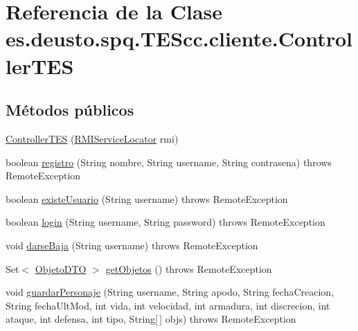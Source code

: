 \hypertarget{classes_1_1deusto_1_1spq_1_1_t_e_scc_1_1cliente_1_1_controller_t_e_s}{\section{Referencia de la Clase es.\+deusto.\+spq.\+T\+E\+Scc.\+cliente.\+Controller\+T\+E\+S}
\label{classes_1_1deusto_1_1spq_1_1_t_e_scc_1_1cliente_1_1_controller_t_e_s}
}
\subsection*{Métodos públicos}
\begin{DoxyCompactItemize}
\item 
\hyperlink{classes_1_1deusto_1_1spq_1_1_t_e_scc_1_1cliente_1_1_controller_t_e_s_a81fda8395f47c407a3f0d577c63f0d3b}{Controller\+T\+E\+S} (\hyperlink{classes_1_1deusto_1_1spq_1_1_t_e_scc_1_1cliente_1_1_r_m_i_service_locator}{R\+M\+I\+Service\+Locator} rmi)
\item 
boolean \hyperlink{classes_1_1deusto_1_1spq_1_1_t_e_scc_1_1cliente_1_1_controller_t_e_s_aff4caec980eda0f4398f4f2cf044fb4f}{registro} (String nombre, String username, String contrasena)  throws Remote\+Exception 
\item 
boolean \hyperlink{classes_1_1deusto_1_1spq_1_1_t_e_scc_1_1cliente_1_1_controller_t_e_s_a452322848dcc1778a46244219881bafc}{existe\+Usuario} (String username)  throws Remote\+Exception 
\item 
boolean \hyperlink{classes_1_1deusto_1_1spq_1_1_t_e_scc_1_1cliente_1_1_controller_t_e_s_a2941198e1c2c65da73798b13b20a4ad8}{login} (String username, String password)  throws Remote\+Exception 
\item 
void \hyperlink{classes_1_1deusto_1_1spq_1_1_t_e_scc_1_1cliente_1_1_controller_t_e_s_acec2816a416111e9fdffba46bc58ab08}{darse\+Baja} (String username)  throws Remote\+Exception 
\item 
Set$<$ \hyperlink{classes_1_1deusto_1_1spq_1_1_t_e_scc_1_1dto_1_1_objeto_d_t_o}{Objeto\+D\+T\+O} $>$ \hyperlink{classes_1_1deusto_1_1spq_1_1_t_e_scc_1_1cliente_1_1_controller_t_e_s_a1ffe0d7b4f3a46cd805f6e1717173fa5}{get\+Objetos} ()  throws Remote\+Exception 
\item 
void \hyperlink{classes_1_1deusto_1_1spq_1_1_t_e_scc_1_1cliente_1_1_controller_t_e_s_a40876e84dc3f730e116d40c0848877d1}{guardar\+Personaje} (String username, String apodo, String fecha\+Creacion, String fecha\+Ult\+Mod, int vida, int velocidad, int armadura, int discrecion, int ataque, int defensa, int tipo, String\mbox{[}$\,$\mbox{]} objs)  throws Remote\+Exception 

\end{DoxyCompactItemize}
